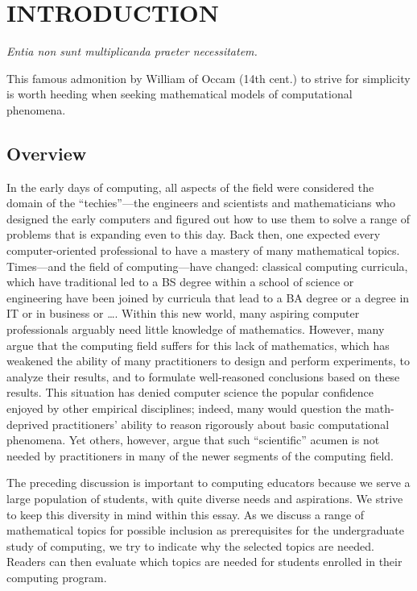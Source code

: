
\chapter{INTRODUCTION}


\begin{center}
{\it Entia non sunt multiplicanda praeter necessitatem.} \\
\end{center}

\noindent
This famous admonition by William of Occam (14th cent.) to strive for
simplicity is worth heeding when seeking mathematical models of
computational phenomena.

\section{Overview}

In the early days of computing, all aspects of the field were
considered the domain of the ``techies''---the engineers and
scientists and mathematicians who designed the early computers and
figured out how to use them to solve a range of problems that is
expanding even to this day.  Back then, one expected every
computer-oriented professional to have a mastery of many mathematical
topics.  Times---and the field of computing---have changed: classical
computing curricula, which have traditional led to a BS degree within
a school of science or engineering have been joined by curricula that
lead to a BA degree or a degree in IT or in business or \ldots.
Within this new world, many aspiring computer professionals arguably
need little knowledge of mathematics.  However, many argue that the
computing field suffers for this lack of mathematics, which has
weakened the ability of many practitioners to design and perform
experiments, to analyze their results, and to formulate well-reasoned
conclusions based on these results.  This situation has denied
computer science the popular confidence enjoyed by other empirical
disciplines; indeed, many would question the math-deprived
practitioners' ability to reason rigorously about basic computational
phenomena.  Yet others, however, argue that such ``scientific'' acumen
is not needed by practitioners in many of the newer segments of the
computing field.

The preceding discussion is important to computing educators because
we serve a large population of students, with quite diverse needs and
aspirations.  We strive to keep this diversity in mind within this
essay.  As we discuss a range of mathematical topics for possible
inclusion as prerequisites for the undergraduate study of computing,
we try to indicate why the selected topics are needed.  Readers can
then evaluate which topics are needed for students enrolled in their
computing program.

